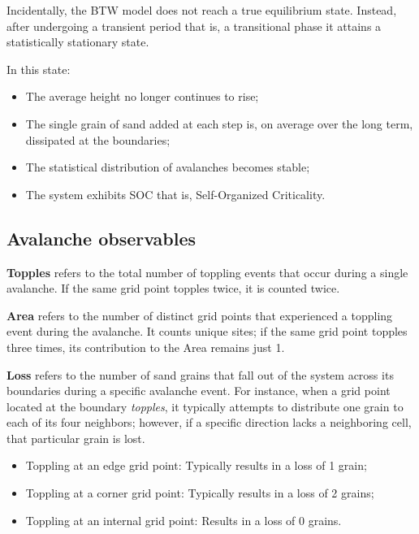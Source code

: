 \documentclass{article}
\begin{document}
Incidentally, the BTW model does not reach a true equilibrium state. Instead, after undergoing a transient period that is, a transitional phase it attains a statistically stationary state.

In this state:
\begin{itemize}
    \item The average height no longer continues to rise;
    \item The single grain of sand added at each step is, on average over the long term, dissipated at the boundaries;
    \item The statistical distribution of avalanches becomes stable;
    \item The system exhibits SOC that is, Self-Organized Criticality.
\end{itemize}

\subsection{Avalanche observables}
\textbf{Topples} refers to the total number of toppling events that occur during a single avalanche. If the same grid point topples twice, it is counted twice.

\hspace{2mm}

\textbf{Area} refers to the number of distinct grid points that experienced a toppling event during the avalanche. It counts unique sites; if the same grid point topples three times, its contribution to the Area remains just 1.

\hspace{2mm}

\textbf{Loss} refers to the number of sand grains that fall out of the system across its boundaries during a specific avalanche event. For instance, when a grid point located at the boundary \textit{topples}, it typically attempts to distribute one grain to each of its four neighbors; however, if a specific direction lacks a neighboring cell, that particular grain is lost.

\begin{itemize}
    \item Toppling at an edge grid point: Typically results in a loss of 1 grain;
    \item Toppling at a corner grid point: Typically results in a loss of 2 grains;
    \item Toppling at an internal grid point: Results in a loss of 0 grains.
\end{itemize}
\end{document}
